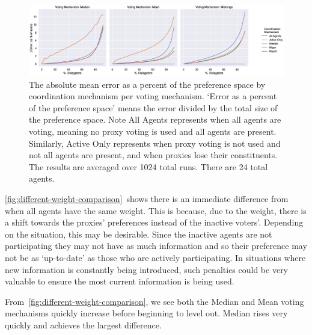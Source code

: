\begin{landscape}
    \begin{figure}[p]
        \centering
        \includegraphics[scale=0.55]
        {content/chapter2/figures/vm_col_cm_hue_error_as_percent_of_space_abs_mean}
        \caption{
            The absolute mean error as a percent of the preference space by
            coordination mechanism per voting mechanism.
            `Error as a percent of the preference space' means the error divided by
            the total size of the preference space.
            Note All Agents represents when all agents are voting, meaning no proxy
            voting is used and all agents are present.
            Similarly, Active Only represents when proxy voting is not used and not
            all agents are present, and when proxies lose their constituents.
            The results are averaged over 1024 total runs.
            There are 24 total agents.
        }
        \label{fig:vm-col-cm-hue-error-as-percent-of-space-abs-mean}
    \end{figure}
\end{landscape}

\autoref{fig:different-weight-comparison}~shows there is an immediate difference from
when all agents have the same weight.
This is because, due to the weight, there is a shift towards the proxies' preferences
instead of the inactive voters'.
Depending on the situation, this may be desirable.
Since the inactive agents are not participating they may not have as much information
and so their preference may not be as `up-to-date' as those who are actively
participating.
In situations where new information is constantly being introduced, such penalties
could be very valuable to ensure the most current information is being used.

From~\autoref{fig:different-weight-comparison}, we see both the Median and Mean
voting mechanisms quickly increase   before beginning to level out.
Median rises very quickly and achieves the largest difference.

